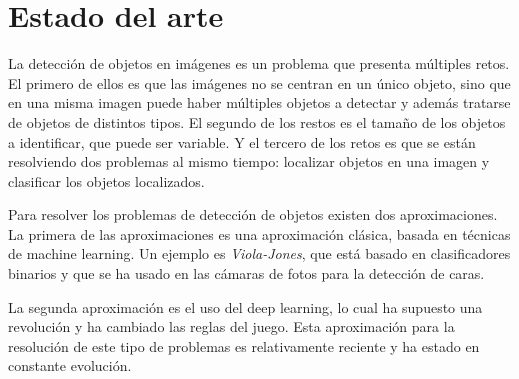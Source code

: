 \section{Estado del arte}
\label{sec:estado_del_arte}



La detección de objetos en imágenes es un problema que presenta múltiples retos. El primero de ellos es que las imágenes no se centran en un único objeto, sino que en una misma imagen puede haber múltiples objetos a detectar y además tratarse de objetos de distintos tipos. El segundo de los restos es el tamaño de los objetos a identificar, que puede ser variable. Y el tercero de los retos es que se están resolviendo dos problemas al mismo tiempo: localizar objetos en una imagen y clasificar los objetos localizados.


Para resolver los problemas de detección de objetos existen dos aproximaciones. La primera de las aproximaciones es una aproximación clásica, basada en técnicas de machine learning. Un ejemplo es \textit{Viola-Jones}, que está basado en clasificadores binarios y que se ha usado en las cámaras de fotos para la detección de caras.

La segunda aproximación es el uso del deep learning, lo cual ha supuesto una revolución y ha cambiado las reglas del juego. Esta aproximación para la resolución de este tipo de problemas es relativamente reciente y ha estado en constante evolución.

